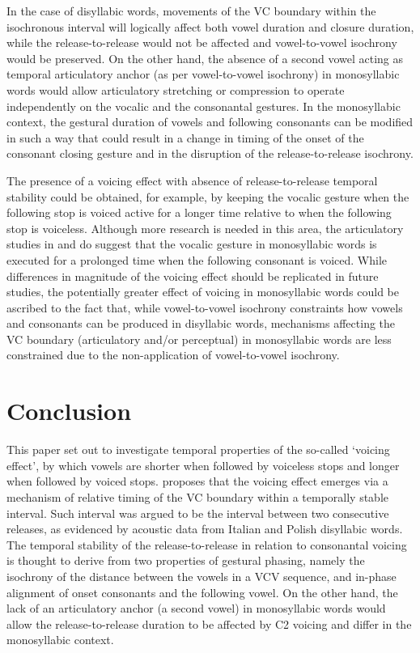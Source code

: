 \documentclass[12pt,a4paper,]{article}
\begin{document}
In the case of disyllabic words, movements of the VC boundary within the
isochronous interval will logically affect both vowel duration and
closure duration, while the release-to-release would not be affected and
vowel-to-vowel isochrony would be preserved. On the other hand, the
absence of a second vowel acting as temporal articulatory anchor (as per
vowel-to-vowel isochrony) in monosyllabic words would allow articulatory
stretching or compression to operate independently on the vocalic and
the consonantal gestures. In the monosyllabic context, the gestural
duration of vowels and following consonants can be modified in such a
way that could result in a change in timing of the onset of the
consonant closing gesture and in the disruption of the
release-to-release isochrony.

The presence of a voicing effect with absence of release-to-release
temporal stability could be obtained, for example, by keeping the
vocalic gesture when the following stop is voiced active for a longer
time relative to when the following stop is voiceless. Although more
research is needed in this area, the articulatory studies in
\citet{raphael1972} and \citet{de-jong1991} do suggest that the vocalic
gesture in monosyllabic words is executed for a prolonged time when the
following consonant is voiced. While differences in magnitude of the
voicing effect should be replicated in future studies, the potentially
greater effect of voicing in monosyllabic words could be ascribed to the
fact that, while vowel-to-vowel isochrony constraints how vowels and
consonants can be produced in disyllabic words, mechanisms affecting the
VC boundary (articulatory and/or perceptual) in monosyllabic words are
less constrained due to the non-application of vowel-to-vowel isochrony.

\hypertarget{conclusion}{%
\section{Conclusion}\label{conclusion}}

This paper set out to investigate temporal properties of the so-called
`voicing effect', by which vowels are shorter when followed by voiceless
stops and longer when followed by voiced stops. \citet{coretta2019k}
proposes that the voicing effect emerges via a mechanism of relative
timing of the VC boundary within a temporally stable interval. Such
interval was argued to be the interval between two consecutive releases,
as evidenced by acoustic data from Italian and Polish disyllabic words.
The temporal stability of the release-to-release in relation to
consonantal voicing is thought to derive from two properties of gestural
phasing, namely the isochrony of the distance between the vowels in a
VCV sequence, and in-phase alignment of onset consonants and the
following vowel. On the other hand, the lack of an articulatory anchor
(a second vowel) in monosyllabic words would allow the
release-to-release duration to be affected by C2 voicing and differ in
the monosyllabic context.
\end{document}
